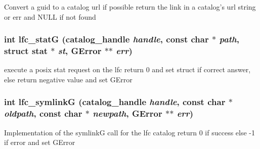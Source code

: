 Convert a guid to a catalog url if possible return the link in a catalog's url string or err and NULL if not found 
\subsubsection{\setlength{\rightskip}{0pt plus 5cm}int lfc\_\-stat\-G (catalog\_\-handle {\em handle}, const char $\ast$ {\em path}, struct stat $\ast$ {\em st}, GError $\ast$$\ast$ {\em err})}\label{gfal__common__lfc_8c_51eb57986d959b753dbad4737f3e1b6f}


execute a posix stat request on the lfc return 0 and set struct if correct answer, else return negative value and set GError 
\subsubsection{\setlength{\rightskip}{0pt plus 5cm}int lfc\_\-symlink\-G (catalog\_\-handle {\em handle}, const char $\ast$ {\em oldpath}, const char $\ast$ {\em newpath}, GError $\ast$$\ast$ {\em err})}\label{gfal__common__lfc_8c_28bfec8a5e66b63c082c444997ec5702}


Implementation of the symlink\-G call for the lfc catalog return 0 if success else -1 if error and set GError 